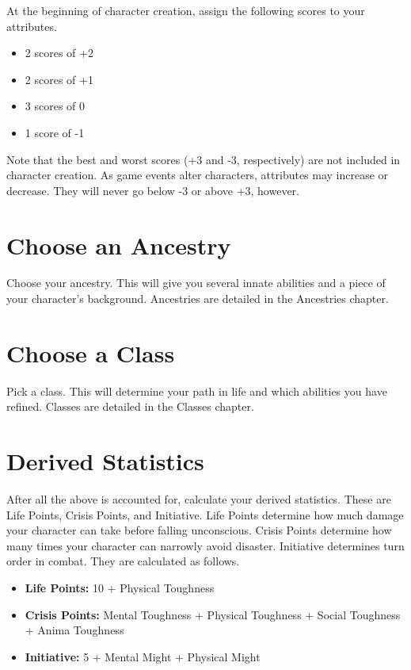 \begin{multicols}{2}
At the beginning of character creation, assign the following scores to
your attributes.

\begin{itemize}
  \item 2 scores of +2
  \item 2 scores of +1
  \item 3 scores of 0
  \item 1 score of -1
\end{itemize}

Note that the best and worst scores (+3 and -3, respectively) are not
included in character creation. As game events alter characters,
attributes may increase or decrease. They will never go below -3 or
above +3, however.

\section{Choose an Ancestry}

Choose your ancestry. This will give you several innate abilities
and a piece of your character's background. Ancestries are detailed
in the Ancestries chapter.

\section{Choose a Class}

Pick a class. This will determine your path in life and which
abilities you have refined. Classes are detailed in the Classes
chapter.

\section{Derived Statistics}

After all the above is accounted for, calculate your derived
statistics. These are Life Points, Crisis Points, and Initiative. Life Points
determine how much damage your character can take before falling
unconscious. Crisis Points determine how many times your character
can narrowly avoid disaster. Initiative determines turn order in combat.
They are calculated as follows.

\begin{itemize}
  \item \textbf{Life Points:} 10 + Physical Toughness
  \item \textbf{Crisis Points:} Mental Toughness + Physical Toughness + Social Toughness + Anima Toughness
  \item \textbf{Initiative:} 5 + Mental Might + Physical Might
\end{itemize}


\end{multicols}

